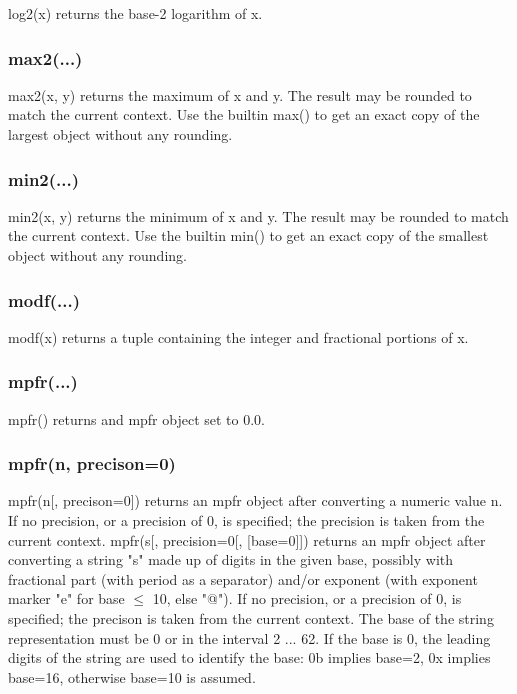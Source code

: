 log2(x) returns the base-2 logarithm of x.

\subsubsection{max2(...)}

max2(x, y) returns the maximum of x and y. The result may be rounded to match the current
context. Use the builtin max() to get an exact copy of the largest object without any rounding.

\subsubsection{min2(...)}

min2(x, y) returns the minimum of x and y. The result may be rounded to match the current
context. Use the builtin min() to get an exact copy of the smallest object without any rounding.

\subsubsection{modf(...)}

modf(x) returns a tuple containing the integer and fractional portions of x.

\subsubsection{mpfr(...)}

mpfr() returns and mpfr object set to 0.0.

\subsubsection{mpfr(n, precison=0)}
mpfr(n[, precison=0]) returns an mpfr object after converting a numeric value n. If no precision,
or a precision of 0, is specified; the precision is taken from the current context.
mpfr(s[, precision=0[, [base=0]]) returns an mpfr object after converting a string "s" made up of
digits in the given base, possibly with fractional part (with period as a separator) and/or
exponent (with exponent marker "e" for base $\le$ 10, else "@"). If no precision, or a precision of
0, is specified; the precison is taken from the current context. The base of the string
representation must be 0 or in the interval 2 ... 62. If the base is 0, the leading digits of the
string are used to identify the base: 0b implies base=2, 0x implies base=16, otherwise
base=10 is assumed.

